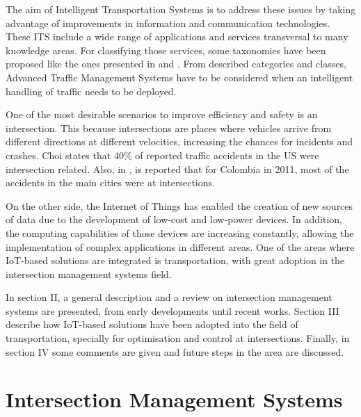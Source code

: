 \documentclass[conference]{IEEEtran}
\begin{document}
The aim of Intelligent Transportation Systems is to address these issues by taking advantage of improvements in information and communication technologies. These ITS include a wide range of applications and services transversal to many knowledge areas. For classifying those services, some taxonomies have been proposed like the ones presented in \cite[Ch.1]{Sussman2005} and \cite{Williams2008}. From described categories and classes, Advanced Traffic Management Systems have to be considered when an intelligent handling of traffic needs to be deployed.

One of the most desirable scenarios to improve efficiency and safety is an intersection. This because intersections are places where vehicles arrive from different directions at different velocities, increasing the chances for incidents and crashes. Choi \cite{Choi2010} states that 40\% of reported traffic accidents in the US were intersection related. Also, in  \cite{CorporacionFondodePrevencionVial2010}, is reported that for Colombia in 2011, most of the accidents in the main cities were at intersections.

On the other side, the Internet of Things has enabled the creation of new sources of data due to the development of low-cost and low-power devices. In addition, the computing capabilities of those devices are increasing constantly, allowing the implementation of complex applications in different areas. One of the areas where IoT-based solutions are integrated is transportation, with great adoption in the intersection management systems field.

In section II, a general description and a review on intersection management systems are presented, from early developments until recent works. Section III describe how IoT-based solutions have been adopted into the field of transportation, specially for optimisation and control at intersections. Finally, in section IV some comments are given and future steps in the area are discussed.

\section{Intersection Management Systems}
\end{document}
